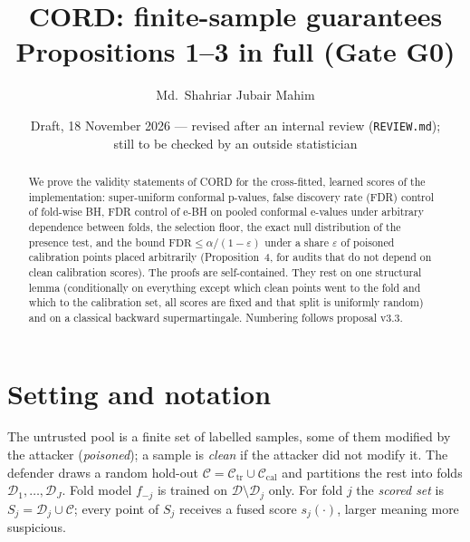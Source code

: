 \documentclass[11pt]{article}
\title{CORD: finite-sample guarantees\\[2pt]\large Propositions 1--3 in full (Gate G0)}
\author{Md.\ Shahriar Jubair Mahim}
\date{Draft, 18 November 2026 --- revised after an internal review (\texttt{REVIEW.md});\\ still to be checked by an outside statistician}
\theoremstyle{definition}
\theoremstyle{remark}
\newcommand{\Cal}{\mathcal{C}_{\mathrm{cal}}}
\newcommand{\Ctr}{\mathcal{C}_{\mathrm{tr}}}
\newcommand{\C}{\mathcal{C}}
\newcommand{\D}{\mathcal{D}}
\newcommand{\1}{\mathbf{1}}
\begin{document}
\maketitle

\begin{abstract}
We prove the validity statements of CORD for the cross-fitted, learned scores of the
implementation: super-uniform conformal p-values, false discovery rate (FDR) control of fold-wise
BH, FDR control of e-BH on pooled conformal e-values under arbitrary dependence between folds,
the selection floor, the exact null distribution of the presence test, and the bound
$\mathrm{FDR}\le\alpha/(1-\varepsilon)$ under a share $\varepsilon$ of poisoned calibration points
placed arbitrarily (Proposition~4, for audits that do not depend on clean calibration scores). The proofs are
self-contained. They rest on one structural lemma (conditionally on everything except which clean
points went to the fold and which to the calibration set, all scores are fixed and that split is
uniformly random) and on a classical backward supermartingale. Numbering follows proposal v3.3.
\end{abstract}

\section{Setting and notation}

The untrusted pool is a finite set of labelled samples, some of them modified by the attacker
(\emph{poisoned}); a sample is \emph{clean} if the attacker did not modify it. The defender draws a
random hold-out $\C=\Ctr\cup\Cal$ and partitions the rest into folds $\D_1,\dots,\D_J$. Fold model
$f_{-j}$ is trained on $\D\setminus\D_j$ only. For fold $j$ the \emph{scored set} is
$S_j=\D_j\cup\C$; every point of $S_j$ receives a fused score $s_j(\cdot)$, larger meaning more
suspicious.
\end{document}
